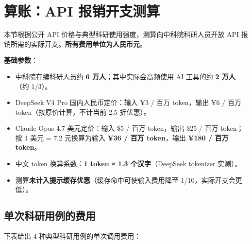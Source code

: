 \section{算账：API 报销开支测算}
\label{sec:cost}

本节根据公开 API 价格与典型科研使用强度，测算向中科院科研人员开放 API 报销所需的实际开支。\textbf{所有费用单位为人民币元}。

\medskip
\textbf{基础参数}：
\begin{itemize}
\item 中科院在编科研人员约 \textbf{6 万人}；其中实际会高频使用 AI 工具的约 \textbf{2 万人}（约 1/3）。
\item DeepSeek V4 Pro 国内人民币定价：输入 ¥3 / 百万 token，输出 ¥6 / 百万 token（按原价计算，不计当前 2.5 折优惠）。
\item Claude Opus 4.7 美元定价：输入 \$5 / 百万 token，输出 \$25 / 百万 token；按 1 美元 = 7.2 元换算为输入 \textbf{¥36 / 百万 token}，输出 \textbf{¥180 / 百万 token}。
\item 中文 token 换算系数：\textbf{1 token ≈ 1.3 个汉字}（DeepSeek tokenizer 实测）。
\item 测算\textbf{未计入提示缓存优惠}（缓存命中可使输入费用降至 1/10，实际开支会更低）。
\end{itemize}

\subsection{单次科研用例的费用}

下表给出 4 种典型科研用例的单次调用费用：

\begin{table}[h]
\centering
\renewcommand{\arraystretch}{1.3}
\end{table}

